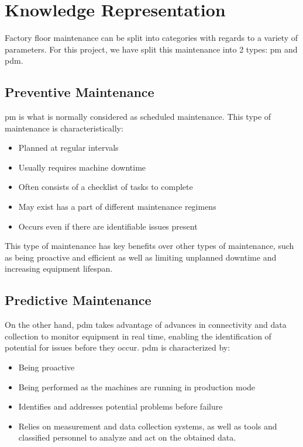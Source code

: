\section{Knowledge Representation}

Factory floor maintenance can be split into categories with regards to a variety of parameters. For this project, we have split this maintenance into 2 types: \acrfull{pm} and \acrfull{pdm}.

\subsection{Preventive Maintenance}

\acrshort{pm} is what is normally considered as scheduled maintenance. This type of maintenance is characteristically:

\begin{itemize}
	\item Planned at regular intervals
	\item Usually requires machine downtime
	\item Often consists of a checklist of tasks to complete
	\item May exist has a part of different maintenance regimens
	\item Occurs even if there are identifiable issues present
\end{itemize}

This type of maintenance has key benefits over other types of maintenance, such as being proactive and efficient as well as limiting unplanned downtime and increasing equipment lifespan.

\subsection{Predictive Maintenance}

On the other hand, \acrshort{pdm} takes advantage of advances in connectivity and data collection to monitor equipment in real time, enabling the identification of potential for issues before they occur. \acrshort{pdm} is characterized by:

\begin{itemize}
	\item Being proactive
	\item Being performed as the machines are running in production mode
	\item Identifies and addresses potential problems before failure
	\item Relies on measurement and data collection systems, as well as tools and classified personnel to analyze and act on the obtained data.
\end{itemize}

